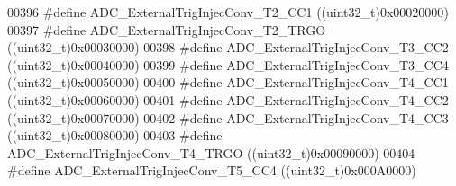 \begin{DoxyCode}
00396 \textcolor{preprocessor}{#}\textcolor{preprocessor}{define} \textcolor{preprocessor}{ADC\_ExternalTrigInjecConv\_T2\_CC1}            \textcolor{preprocessor}{(}\textcolor{preprocessor}{(}\textcolor{preprocessor}{uint32\_t}\textcolor{preprocessor}{)}0x00020000\textcolor{preprocessor}{)}
00397 \textcolor{preprocessor}{#}\textcolor{preprocessor}{define} \textcolor{preprocessor}{ADC\_ExternalTrigInjecConv\_T2\_TRGO}           \textcolor{preprocessor}{(}\textcolor{preprocessor}{(}\textcolor{preprocessor}{uint32\_t}\textcolor{preprocessor}{)}0x00030000\textcolor{preprocessor}{)}
00398 \textcolor{preprocessor}{#}\textcolor{preprocessor}{define} \textcolor{preprocessor}{ADC\_ExternalTrigInjecConv\_T3\_CC2}            \textcolor{preprocessor}{(}\textcolor{preprocessor}{(}\textcolor{preprocessor}{uint32\_t}\textcolor{preprocessor}{)}0x00040000\textcolor{preprocessor}{)}
00399 \textcolor{preprocessor}{#}\textcolor{preprocessor}{define} \textcolor{preprocessor}{ADC\_ExternalTrigInjecConv\_T3\_CC4}            \textcolor{preprocessor}{(}\textcolor{preprocessor}{(}\textcolor{preprocessor}{uint32\_t}\textcolor{preprocessor}{)}0x00050000\textcolor{preprocessor}{)}
00400 \textcolor{preprocessor}{#}\textcolor{preprocessor}{define} \textcolor{preprocessor}{ADC\_ExternalTrigInjecConv\_T4\_CC1}            \textcolor{preprocessor}{(}\textcolor{preprocessor}{(}\textcolor{preprocessor}{uint32\_t}\textcolor{preprocessor}{)}0x00060000\textcolor{preprocessor}{)}
00401 \textcolor{preprocessor}{#}\textcolor{preprocessor}{define} \textcolor{preprocessor}{ADC\_ExternalTrigInjecConv\_T4\_CC2}            \textcolor{preprocessor}{(}\textcolor{preprocessor}{(}\textcolor{preprocessor}{uint32\_t}\textcolor{preprocessor}{)}0x00070000\textcolor{preprocessor}{)}
00402 \textcolor{preprocessor}{#}\textcolor{preprocessor}{define} \textcolor{preprocessor}{ADC\_ExternalTrigInjecConv\_T4\_CC3}            \textcolor{preprocessor}{(}\textcolor{preprocessor}{(}\textcolor{preprocessor}{uint32\_t}\textcolor{preprocessor}{)}0x00080000\textcolor{preprocessor}{)}
00403 \textcolor{preprocessor}{#}\textcolor{preprocessor}{define} \textcolor{preprocessor}{ADC\_ExternalTrigInjecConv\_T4\_TRGO}           \textcolor{preprocessor}{(}\textcolor{preprocessor}{(}\textcolor{preprocessor}{uint32\_t}\textcolor{preprocessor}{)}0x00090000\textcolor{preprocessor}{)}
00404 \textcolor{preprocessor}{#}\textcolor{preprocessor}{define} \textcolor{preprocessor}{ADC\_ExternalTrigInjecConv\_T5\_CC4}            \textcolor{preprocessor}{(}\textcolor{preprocessor}{(}\textcolor{preprocessor}{uint32\_t}\textcolor{preprocessor}{)}0x000A0000\textcolor{preprocessor}{)}

\end{DoxyCode}
